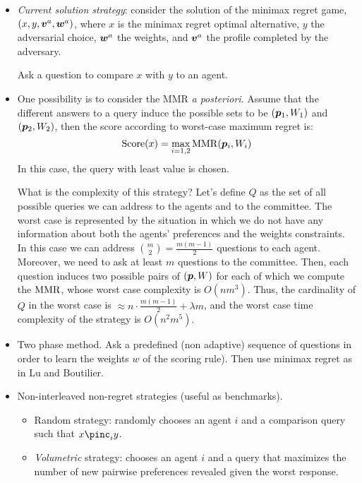 \begin{itemize}
\item {\em Current solution strategy}: consider the solution of the minimax regret game, 
 $(x,y,\bm{v}^{a},\bm{w}^{a})$, where $x$ is the minimax regret optimal alternative, $y$ the adversarial choice, $\bm{w}^{a}$ the weights, and $\bm{v}^{a}$ the profile completed by the adversary.

Ask a question to compare $x$ with $y$ to an agent.

 
 \item One possibility is to consider the MMR {\em a posteriori}. Assume that the different answers to a query induce the possible sets to be $(\bm{p}_1,W_1)$ and $(\bm{p}_2,W_2)$, then the score according to worst-case maximum regret is:
\[\operatorname{Score}(x)= \max_{i=1,2} \operatorname{MMR}(\bm{p}_i,W_i) \]
In this case, the query with least value is chosen.

What is the complexity of this strategy? Let's define $Q$ as the set of all possible queries we can address to the agents and to the committee. The worst case is represented by the situation in which we do not have any information about both the agents' preferences and the weights constraints. In this case we can address $\binom{m}{2}=\frac{m(m-1)}{2}$ questions to each agent. Moreover, we need to ask at least $m$ questions to the committee. Then, each question induces two possible pairs of $(\bm{p},W)$ for each of which we compute the $\operatorname{MMR}$, whose worst case complexity is $O(nm^3)$. Thus, the cardinality of $Q$ in the worst case is $\approx n \cdot \frac{m(m-1)}{2} + \lambda m$, and the worst case time complexity of the strategy is $O(n^2m^5)$.

\item Two phase method.
Ask a predefined (non adaptive) sequence of questions in order to learn the weights $w$ of the scoring rule).
Then use minimax regret as in Lu and Boutilier.


\item Non-interleaved non-regret strategies (useful as benchmarks).	
	\begin{itemize}
		\item Random strategy: randomly chooses an agent $i$ and a comparison query such that $x \pinc_i y$.
		\item {\em Volumetric} strategy: chooses an agent $i$ and a query that maximizes the number of new pairwise preferences revealed given the worst response.
	\end{itemize}
\end{itemize}


